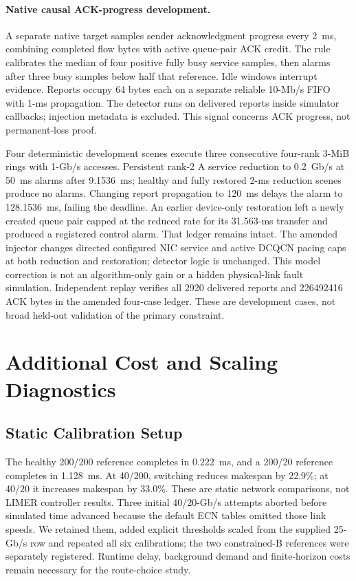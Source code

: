 \documentclass[sigconf]{acmart}
\begin{document}
\paragraph{Native causal ACK-progress development.}
A separate native target samples sender acknowledgment progress every
2~ms, combining completed flow bytes with active queue-pair ACK credit.
The rule calibrates the median of four positive fully busy service
samples, then alarms after three busy samples below half that reference.
Idle windows interrupt evidence. Reports occupy 64 bytes each on a
separate reliable 10-Mb/s FIFO with 1-ms propagation. The detector runs
on delivered reports inside simulator callbacks; injection metadata is
excluded. This signal concerns ACK progress, not permanent-loss proof.

Four deterministic development scenes execute three consecutive four-rank
3-MiB rings with 1-Gb/s accesses. Persistent rank-2 A service reduction
to 0.2~Gb/s at 50~ms alarms after 9.1536~ms; healthy and fully restored
2-ms reduction scenes produce no alarms. Changing report propagation to
120~ms delays the alarm to 128.1536~ms, failing the deadline. An earlier
device-only restoration left a newly created queue pair capped at the
reduced rate for its 31.563-ms transfer and produced a registered control
alarm. That ledger remains intact. The amended injector changes directed
configured NIC service and active DCQCN pacing caps at both reduction and
restoration; detector logic is unchanged. This model correction is not an
algorithm-only gain or a hidden physical-link fault simulation. Independent
replay verifies all 2920 delivered reports and 226492416 ACK bytes in
the amended four-case ledger. These are development cases, not broad
held-out validation of the primary constraint.

\section{Additional Cost and Scaling Diagnostics}
\label{app:cost-diagnostics}
\subsection{Static Calibration Setup}
The healthy 200/200 reference completes in 0.222~ms, and a 200/20
reference completes in 1.128~ms. At 40/200, switching reduces makespan
by 22.9\%; at 40/20 it increases makespan by 33.0\%. These are static
network comparisons, not LIMER controller results. Three initial
40/20-Gb/s attempts aborted before simulated time advanced because the
default ECN tables omitted those link speeds. We retained them, added
explicit thresholds scaled from the supplied 25-Gb/s row and repeated
all six calibrations; the two constrained-B references were separately
registered. Runtime delay, background demand and finite-horizon costs
remain necessary for the route-choice study.
\end{document}
